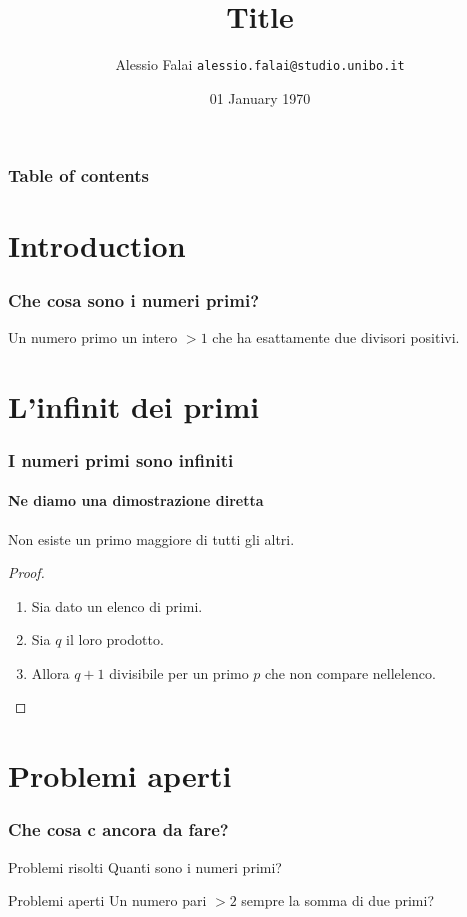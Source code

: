 \documentclass{beamer}
\title{Title}
\author[A. Falai]{Alessio Falai \newline \texttt{alessio.falai@studio.unibo.it}}
\date[01/01/1970]{01 January 1970}
\institute[UNIBO]{Alma Mater Studiorum - University of Bologna}
\begin{document}
\begin{frame}
	\maketitle
\end{frame}

\begin{frame}
	\frametitle{Table of contents}
	\tableofcontents
\end{frame}

\section{Introduction}
\begin{frame}
	\frametitle{Che cosa sono i numeri primi?}
	\begin{definition}
		Un \alert{numero primo} un intero $>1$ che ha esattamente
		due divisori positivi.
	\end{definition}
\end{frame}

\section{L’infinit dei primi}
\begin{frame}
	\frametitle{I numeri primi sono infiniti}
	\framesubtitle{Ne diamo una dimostrazione diretta}
	\begin{theorem}
		Non esiste un primo maggiore di tutti gli altri.
	\end{theorem}
	\pause
	\begin{proof}
		\begin{enumerate}[<+->]
			\item Sia dato un elenco di primi.
			\item Sia $q$ il loro prodotto.
			\item Allora $q+1$  divisibile per un primo $p$
			che non compare nellelenco. \qedhere
		\end{enumerate}
	\end{proof}
\end{frame}

\section{Problemi aperti}
\begin{frame}
	\frametitle{Che cosa c ancora da fare?}
	\begin{block}{Problemi risolti}
		Quanti sono i numeri primi?
	\end{block}
	\begin{block}{Problemi aperti}
		Un numero pari $>2$ sempre la somma di due primi?
	\end{block}
\end{frame}
\end{document}
